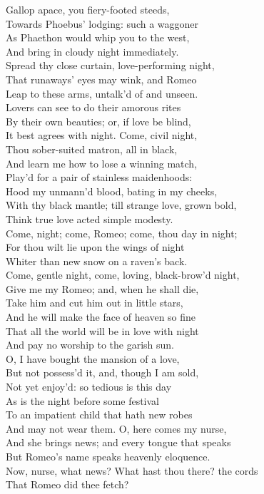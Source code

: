  
\begin{speech}
Gallop apace, you fiery-footed steeds, \\
Towards Phoebus' lodging: such a waggoner \\
As Phaethon would whip you to the west, \\
And bring in cloudy night immediately. \\
Spread thy close curtain, love-performing night, \\
That runaways' eyes may wink, and Romeo \\
Leap to these arms, untalk'd of and unseen. \\
Lovers can see to do their amorous rites \\
By their own beauties; or, if love be blind, \\
It best agrees with night. Come, civil night, \\
Thou sober-suited matron, all in black, \\
And learn me how to lose a winning match, \\
Play'd for a pair of stainless maidenhoods: \\
Hood my unmann'd blood, bating in my cheeks, \\
With thy black mantle; till strange love, grown bold, \\
Think true love acted simple modesty. \\
Come, night; come, Romeo; come, thou day in night; \\
For thou wilt lie upon the wings of night \\
Whiter than new snow on a raven's back. \\
Come, gentle night, come, loving, black-brow'd night, \\
Give me my Romeo; and, when he shall die, \\
Take him and cut him out in little stars, \\
And he will make the face of heaven so fine \\
That all the world will be in love with night \\
And pay no worship to the garish sun. \\
O, I have bought the mansion of a love, \\
But not possess'd it, and, though I am sold, \\
Not yet enjoy'd: so tedious is this day \\
As is the night before some festival \\
To an impatient child that hath new robes \\
And may not wear them. O, here comes my nurse, \\
And she brings news; and every tongue that speaks \\
But Romeo's name speaks heavenly eloquence. 
\\
Now, nurse, what news?   What hast thou there? the cords \\
That Romeo did thee fetch? \\
\end{speech}
